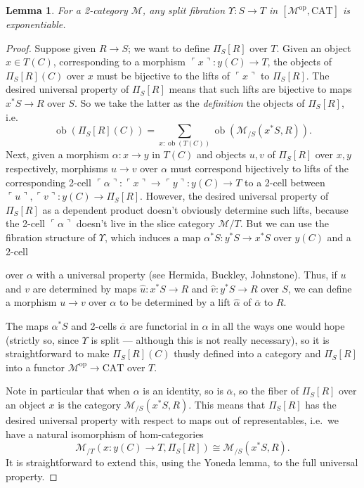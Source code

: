 \documentclass[10pt]{article}
\newtheorem{lemma}{Lemma}
\theoremstyle{definition}
\DeclareMathOperator{\ob}{ob}
\newcommand\op{^{\mathrm{op}}}
\newcommand\CAT{\mathrm{CAT}}
\newcommand\M{\mathcal{M}}
\newcommand\Ups{\Upsilon}
\newcommand\name[1]{\ulcorner #1\urcorner}
\begin{document}
\begin{lemma}\label{thm:fib-exp}
  For a 2-category $\M$, any split fibration $\Ups : S\to T$ in $[\M\op,\CAT]$ is exponentiable.
\end{lemma}
\begin{proof}
  Suppose given $R\to S$; we want to define $\Pi_S[R]$ over $T$.
  Given an object $x\in T(C)$, corresponding to a morphism $\name{x}:y(C)\to T$, the objects of $\Pi_S[R](C)$ over $x$ must be bijective to the lifts of $\name{x}$ to $\Pi_S [R]$.
  The desired universal property of $\Pi_S [R]$ means that such lifts are bijective to maps $x^* S \to R$ over $S$.
  So we take the latter as the \emph{definition} the objects of $\Pi_S [R]$, i.e.\
  \[ \ob (\Pi_S [R](C)) = \sum_{x:\ob (T(C))} \ob (\M_{/S}(x^*S, R)). \]
  Next, given a morphism $\alpha :x\to y$ in $T(C)$ and objects $u,v$ of $\Pi_S[R]$ over $x,y$ respectively, morphisms $u\to v$ over $\alpha$ must correspond bijectively to lifts of the corresponding 2-cell $\name{\alpha} :\name{x} \to \name{y} :y(C) \to T$ to a 2-cell between $\name{u},\name{v} : y(C) \to \Pi_S[R]$.
  However, the desired universal property of $\Pi_S[R]$ as a dependent product doesn't obviously determine such lifts, because the 2-cell $\name{\alpha}$ doesn't live in the slice category $\M/T$.
  But we can use the fibration structure of $\Ups$, which induces a map $\alpha^*S : y^*S \to x^*S$ over $y(C)$ and a 2-cell
  \begin{center}
  \end{center}
  over $\alpha$ with a universal property (see Hermida, Buckley, Johnstone).
  Thus, if $u$ and $v$ are determined by maps $\hat{u}:x^*S \to R$ and $\hat{v}:y^*S\to R$ over $S$, we can define a morphism $u\to v$ over $\alpha$ to be determined by a lift $\hat{\alpha}$ of $\overline{\alpha}$ to $R$.

  The maps $\alpha^*S $ and 2-cells $\overline{\alpha}$ are functorial in $\alpha$ in all the ways one would hope (strictly so, since $\Ups$ is split --- although this is not really necessary), so it is straightforward to make $\Pi_S[R](C)$ thusly defined into a category and $\Pi_S[R]$ into a functor $\M\op\to\CAT$ over $T$.

  Note in particular that when $\alpha$ is an identity, so is $\overline{\alpha}$, so the fiber of $\Pi_S[R]$ over an object $x$ is the category $\M_{/S}(x^*S, R)$.
  This means that $\Pi_S[R]$ has the desired universal property with respect to maps out of representables, i.e.\ we have a natural isomorphism of hom-categories
  \[\M_{/T}(x:y(C)\to T,\Pi_S[R]) \cong \M_{/S}(x^*S, R).\]
  It is straightforward to extend this, using the Yoneda lemma, to the full universal property.
\end{proof}
\end{document}
